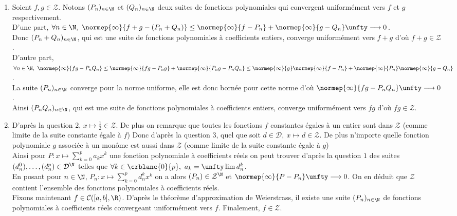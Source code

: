 \documentclass{book}
\begin{document}
\begin{enumerate}[leftmargin=*]
\begin{enumerate}[label=\alph*.]
			On conclut que $(\varphi_n)_{n\in \N}$ CVU vers la fonction constante égale à $\displaystyle\frac{1}{2}$ sur $[a,b]$.
		\end{enumerate}
		\item Soient $f,g\in \mathcal Z$. Notons $(P_n)_{n\in \N}$ et $(Q_n)_{n\in \N}$ deux suites de fonctions polynomiales qui convergent uniformément vers $f$ et $g$ respectivement.\\
		D'une part, $\forall n\in \N,\ \normep{\infty}{f+g-(P_n+Q_n)}\leq \normep{\infty}{f-P_n}+\normep{\infty}{g-Q_n}\unfty\longrightarrow 0$.\\
		Donc $(P_n+Q_n)_{n\in \N}$, qui est une suite de fonctions polynomiales à coefficients entiers, converge uniformément vers $f+g$ d'où $f+g\in \mathcal Z$.\\
		D'autre part, $\forall n\in \N,\ \normep{\infty}{fg-P_nQ_n}\leq \normep{\infty}{fg-P_ng}+\normep{\infty}{P_ng-P_nQ_n}\leq\normep{\infty}{g}\normep{\infty}{f-P_n}+\normep{\infty}{P_n}\normep{\infty}{g-Q_n}$.\\
		La suite $(P_n)_{n\in \N}$ converge pour la norme uniforme, elle est donc bornée pour cette norme d'où $\normep{\infty}{fg-P_nQ_n}\unfty\longrightarrow 0$.\\
		Ainsi $(P_nQ_n)_{n\in \N}$, qui est une suite de fonctions polynomiales à coefficients entiers, converge uniformément vers $fg$ d'où $fg\in \mathcal Z$.
		\item D'après la question $2$, $x\mapsto \displaystyle\frac{1}{2}\in \mathcal Z$. De plus on remarque que toutes les fonctions $f$ constantes égales à un entier sont dans $\mathcal Z$ (comme limite de la suite constante égale à $f$) Donc d'après la question $3$, quel que soit $d\in \mathcal D,\ x\mapsto d\in \mathcal Z$. De plus n'importe quelle fonction polynomiale $g$ associée à un monôme est aussi dans $\mathcal Z$ (comme limite de la suite constante égale à $g$)\\
		Ainsi pour $P:x\mapsto \displaystyle\sum_{k=0}^pa_kx^k$ une fonction polynomiale à coefficients réels on peut trouver d'après la question $1$ des suites $(d_n^0),\dots,(d_n^p)\in \mathcal D^\N$ telles que $\forall k\in \crblanc{0}{p},\ a_k=\unfty\lim d_n^k$.\\
		En posant pour $n\in \N$, $P_n:x\mapsto \displaystyle\sum_{k=0}^pd_n^kx^k$ on a alors $(P_n)\in \mathcal Z^\N$ et $\normep{\infty}{P-P_n}\unfty\longrightarrow 0$. On en déduit que $\mathcal Z$ contient l'ensemble des fonctions polynomiales à coefficients réels.\\
		Fixons maintenant $f\in \mathcal C([a,b],\R)$. D'après le théorème d'approximation de Weierstrass, il existe une suite $(P_n)_{n\in \N}$ de fonctions polynomiales à coefficients réels convergeant uniformément vers $f$. Finalement, $f\in \mathcal Z$.\\

\end{enumerate}
\end{document}

